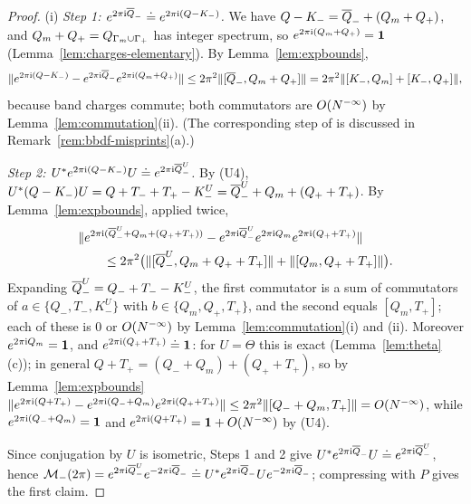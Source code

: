 \begin{proof}
(i) \emph{Step 1: $e^{2\pi\mathrm{i}\overline{Q}_-}\doteq e^{2\pi\mathrm{i}(Q-K_-)}$.} We have $Q-K_-=\overline{Q}_-+(Q_m+Q_+)$, and $Q_m+Q_+=Q_{\Gamma_{m}\cup\Gamma_{+}}$ has
integer spectrum, so $e^{2\pi\mathrm{i}(Q_m+Q_+)}=\mathbf{1}$ (Lemma~\ref{lem:charges-elementary}). By Lemma~\ref{lem:expbounds},
\[
\lVert e^{2\pi\mathrm{i}(Q-K_-)}-e^{2\pi\mathrm{i}\overline{Q}_-}e^{2\pi\mathrm{i}(Q_m+Q_+)}\rVert\le2\pi^2\lVert[\overline{Q}_-,Q_m+Q_+]\rVert
=2\pi^2\lVert[K_-,Q_m]+[K_-,Q_+]\rVert,
\]
because band charges commute; both commutators are $O(N^{-\infty})$ by Lemma~\ref{lem:commutation}(ii). (The corresponding
step of \cite[Section~4.2]{BBDF21} is discussed in Remark~\ref{rem:bbdf-misprints}(a).)

\emph{Step 2: $U^*e^{2\pi\mathrm{i}(Q-K_-)}U\doteq e^{2\pi\mathrm{i}\overline{Q}^U_-}$.} By (U4),
$U^*(Q-K_-)U=Q+T_-+T_+-K^U_-=\overline{Q}^U_-+Q_m+(Q_++T_+)$. By Lemma~\ref{lem:expbounds}, applied twice,
\begin{align*}
&\lVert e^{2\pi\mathrm{i}(\overline{Q}^U_-+Q_m+(Q_++T_+))}-e^{2\pi\mathrm{i}\overline{Q}^U_-}e^{2\pi\mathrm{i} Q_m}e^{2\pi\mathrm{i}(Q_++T_+)}\rVert\\
&\qquad\le2\pi^2\bigl(\lVert[\overline{Q}^U_-,Q_m+Q_++T_+]\rVert+\lVert[Q_m,Q_++T_+]\rVert\bigr).
\end{align*}
Expanding $\overline{Q}^U_-=Q_-+T_--K^U_-$, the first commutator is a sum of commutators of $a\in\{Q_-,T_-,K^U_-\}$ with
$b\in\{Q_m,Q_+,T_+\}$, and the second equals $[Q_m,T_+]$; each of these is $0$ or $O(N^{-\infty})$ by Lemma~\ref{lem:commutation}(i)
and (ii). Moreover $e^{2\pi\mathrm{i} Q_m}=\mathbf{1}$, and $e^{2\pi\mathrm{i}(Q_++T_+)}\doteq\mathbf{1}$: for $U=\Theta$ this is exact
(Lemma~\ref{lem:theta}(c)); in general $Q+T_+=(Q_-+Q_m)+(Q_++T_+)$, so by Lemma~\ref{lem:expbounds}
$\lVert e^{2\pi\mathrm{i}(Q+T_+)}-e^{2\pi\mathrm{i}(Q_-+Q_m)}e^{2\pi\mathrm{i}(Q_++T_+)}\rVert\le2\pi^2\lVert[Q_-+Q_m,T_+]\rVert=O(N^{-\infty})$, while
$e^{2\pi\mathrm{i}(Q_-+Q_m)}=\mathbf{1}$ and $e^{2\pi\mathrm{i}(Q+T_+)}=\mathbf{1}+O(N^{-\infty})$ by (U4).

Since conjugation by $U$ is isometric, Steps 1 and 2 give $U^*e^{2\pi\mathrm{i}\overline{Q}_-}U\doteq e^{2\pi\mathrm{i}\overline{Q}^U_-}$, hence
$\mathcal M_-(2\pi)=e^{2\pi\mathrm{i}\overline{Q}^U_-}e^{-2\pi\mathrm{i}\overline{Q}_-}\doteq U^*e^{2\pi\mathrm{i}\overline{Q}_-}Ue^{-2\pi\mathrm{i}\overline{Q}_-}$; compressing with $P$ gives the first
claim.


\end{proof}
